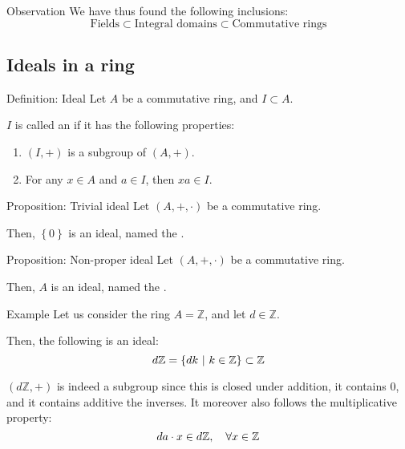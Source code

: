 \documentclass[a4paper]{article}
\begin{document}
\begin{parag}{Observation}
    We have thus found the following inclusions:
    \[\text{Fields} \subset \text{Integral domains} \subset \text{Commutative rings}\]
\end{parag}

\subsection{Ideals in a ring}

\begin{parag}{Definition: Ideal}
    Let $A$ be a commutative ring, and $I \subset A$.

    $I$ is called an  if it has the following properties:
    \begin{enumerate}
        \item $\left(I, +\right)$ is a subgroup of $\left(A, +\right)$.
        \item For any $x \in A$ and $a \in I$, then $xa \in I$.
    \end{enumerate}
\end{parag}

\begin{parag}{Proposition: Trivial ideal}
    Let $\left(A, +, \cdot \right)$ be a commutative ring.

    Then, $\left\{0\right\}$ is an ideal, named the .
\end{parag}

\begin{parag}{Proposition: Non-proper ideal}
    Let $\left(A, +, \cdot \right)$ be a commutative ring.

    Then, $A$ is an ideal, named the .
\end{parag}

\begin{parag}{Example}
    Let us consider the ring $A = \mathbb{Z}$, and let $d \in \mathbb{Z}$. 

    Then, the following is an ideal: 
    \[d\mathbb{Z} = \left\{dk \suchthat k \in \mathbb{Z}\right\} \subset \mathbb{Z}\]
    
    $\left(d\mathbb{Z}, +\right)$ is indeed a subgroup since this is closed under addition, it contains $0$, and it contains additive the inverses. It moreover also follows the multiplicative property: 
    \[da \cdot  x \in d\mathbb{Z}, \quad \forall x \in \mathbb{Z}\]
\end{parag}
\end{document}
